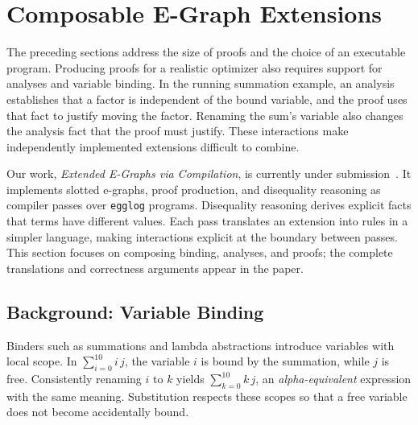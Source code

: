 \section{Composable E-Graph Extensions}
\label{sec:extensions}

The preceding sections address the size of proofs and the choice of an executable program.
Producing proofs for a realistic optimizer also requires support for analyses and variable binding.
In the running summation example, an analysis establishes that a factor is independent
  of the bound variable, and the proof uses that fact to justify moving the factor.
Renaming the sum's variable also changes the analysis fact that the proof must justify.
These interactions make independently implemented extensions difficult to combine.

Our work, \emph{Extended E-Graphs via Compilation}, is currently under submission~\cite{extended-egglog}.
It implements slotted e-graphs, proof production, and disequality reasoning
  as compiler passes over \texttt{egglog} programs.
Disequality reasoning derives explicit facts that terms have different values.
Each pass translates an extension into rules in a simpler language,
  making interactions explicit at the boundary between passes.
This section focuses on composing binding, analyses, and proofs;
  the complete translations and correctness arguments appear in the paper.

\subsection{Background: Variable Binding}
\label{sec:background-binding}

Binders such as summations and lambda abstractions introduce variables with local scope.
In $\sum_{i=0}^{10} i\,j$, the variable $i$ is bound by the summation,
  while $j$ is free.
Consistently renaming $i$ to $k$ yields $\sum_{k=0}^{10} k\,j$,
  an \emph{alpha-equivalent} expression with the same meaning.
Substitution respects these scopes so that a free variable does not become accidentally bound.


